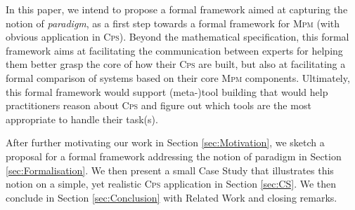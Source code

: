 In this paper, we intend to propose a formal framework aimed at capturing the 
notion of \emph{paradigm}, as a first step towards a formal framework for 
\textsc{Mpm} (with obvious application in \textsc{Cps}). Beyond the 
mathematical specification, this formal framework aims at facilitating the 
communication between experts for helping them better grasp the core of 
how their \textsc{Cps} are built, but also at facilitating a formal comparison 
of systems based on their core \textsc{Mpm} components. Ultimately, this formal 
framework would support (meta-)tool building that would help practitioners 
reason about \textsc{Cps} and figure out which tools are the most appropriate 
to handle their task(s).

After further motivating our work in Section \ref{sec:Motivation}, we sketch a 
proposal for a formal framework addressing the notion of paradigm in Section 
\ref{sec:Formalisation}. We then present a small Case Study that illustrates 
this notion on a simple, yet realistic \textsc{Cps} application in Section 
\ref{sec:CS}. We then conclude in Section \ref{sec:Conclusion} with 
Related Work and closing remarks.

